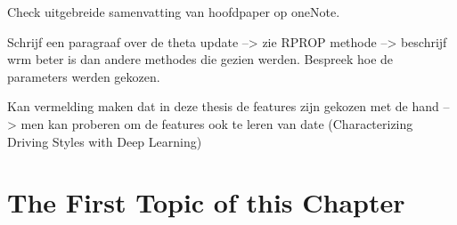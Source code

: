 Check uitgebreide samenvatting van hoofdpaper op oneNote.

Schrijf een paragraaf over de theta update --> zie RPROP methode --> beschrijf wrm beter is dan andere methodes die gezien werden. Bespreek hoe de parameters werden gekozen. 


Kan vermelding maken dat in deze thesis de features zijn gekozen met de hand --> men kan proberen om de features ook te leren van date (Characterizing Driving Styles with Deep Learning)

\clearpage




\section{The First Topic of this Chapter}


